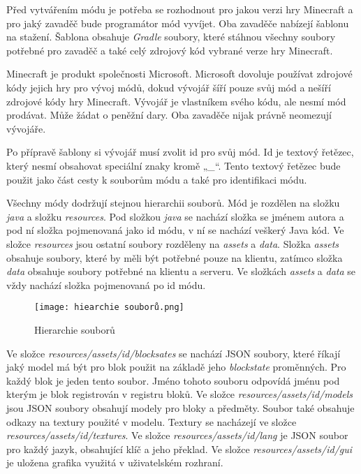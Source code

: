 \documentclass[FM,Proj,bw]{tulthesis}
\begin{document}
\par Před vytvářením módu je potřeba se rozhodnout pro jakou verzi hry Minecraft a pro jaký zavaděč bude programátor mód vyvíjet. Oba zavaděče nabízejí šablonu na stažení. Šablona obsahuje \textit{Gradle} soubory, které stáhnou všechny soubory potřebné pro zavaděč a také celý zdrojový kód vybrané verze 
hry Minecraft. 
\par Minecraft je produkt společnosti Microsoft. Microsoft dovoluje používat zdrojové kódy jejich hry pro vývoj módů, dokud vývojář šíří pouze svůj mód a nešíří zdrojové kódy hry Minecraft. Vývojář je vlastníkem svého kódu, ale nesmí mód prodávat. Může žádat o peněžní dary. Oba zavaděče nijak právně neomezují vývojáře.
\par Po přípravě šablony si vývojář musí zvolit id pro svůj mód. Id je textový řetězec, který nesmí obsahovat speciální znaky kromě „\textit{\_}“.  Tento textový řetězec bude použit jako část cesty k souborům módu a také pro identifikaci módu. 
\par Všechny módy dodržují stejnou hierarchii souborů. Mód je rozdělen na složku \textit{java} a složku \textit{resources}.  Pod složkou \textit{java} se nachází složka se jménem autora a pod ní složka pojmenovaná jako id módu, v ní se nachází veškerý Java kód. Ve složce \textit{resources} jsou ostatní soubory rozděleny na \textit{assets} a \textit{data}. Složka \textit{assets} obsahuje soubory, které by měli být potřebné pouze na klientu, zatímco složka \textit{data} obsahuje soubory potřebné na klientu a serveru. Ve složkách \textit{assets} a \textit{data} se vždy nachází složka pojmenovaná po id módu.
\begin{figure}
    \centering
    \texttt{[image: hiearchie souborů.png]}
    \caption{Hierarchie souborů}
    \label{Hierarchie souborů}
\end{figure}
\par Ve složce \textit{resources/assets/id/blocksates} se nachází JSON soubory, které říkají jaký model má být pro blok použit na základě jeho \textit{blockstate} proměnných. Pro každý blok je jeden tento soubor. Jméno tohoto souboru odpovídá jménu pod kterým je blok registrován v registru bloků. Ve složce  \textit{resources/assets/id/models} jsou JSON soubory  obsahují modely pro bloky a předměty. Soubor také obsahuje odkazy na textury použité v modelu. Textury se nacházejí ve složce \textit{resources/assets/id/textures}. Ve složce \textit{resources/assets/id/lang} je JSON soubor pro každý jazyk, obsahující klíč a jeho překlad. Ve  složce \textit{resources/assets/id/gui} je uložena grafika využitá v uživatelském rozhraní.
\end{document}
